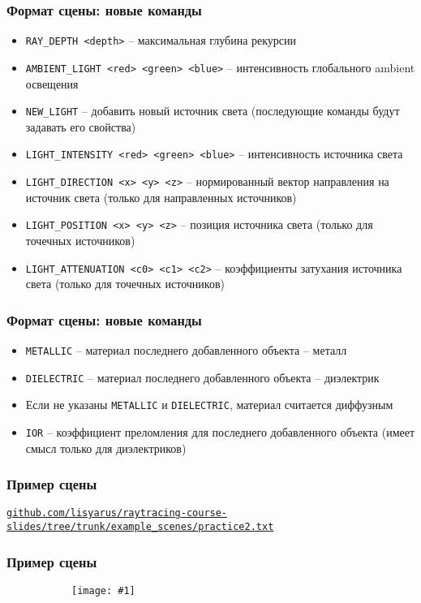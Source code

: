 \documentclass[10pt,handout]{beamer}
\newcommand{\slideimage}[1]{
  \begin{figure}
    \begin{adjustbox}{width=\textwidth, totalheight=\textheight-2\baselineskip-2\baselineskip,keepaspectratio}
      \texttt{[image: \#1]}
    \end{adjustbox}
  \end{figure}
}
\begin{document}
\begin{frame}
\frametitle{Формат сцены: новые команды}
\begin{itemize}
\item \texttt{RAY\_DEPTH <depth>} -- максимальная глубина рекурсии
\item \texttt{AMBIENT\_LIGHT <red> <green> <blue>} -- интенсивность глобального ambient освещения
\item \texttt{NEW\_LIGHT} -- добавить новый источник света (последующие команды будут задавать его свойства)
\item \texttt{LIGHT\_INTENSITY <red> <green> <blue>} -- интенсивность источника света
\item \texttt{LIGHT\_DIRECTION <x> <y> <z>} -- нормированный вектор направления на источник света (только для направленных источников)
\item \texttt{LIGHT\_POSITION <x> <y> <z>} -- позиция источника света (только для точечных источников)
\item \texttt{LIGHT\_ATTENUATION <c0> <c1> <c2>} -- коэффициенты затухания источника света (только для точечных источников)
\end{itemize}
\end{frame}

\begin{frame}
\frametitle{Формат сцены: новые команды}
\begin{itemize}
\item \texttt{METALLIC} -- материал последнего добавленного объекта -- металл
\item \texttt{DIELECTRIC} -- материал последнего добавленного объекта -- диэлектрик
\item Если не указаны \texttt{METALLIC} и \texttt{DIELECTRIC}, материал считается диффузным
\item \texttt{IOR} -- коэффициент преломления для последнего добавленного объекта (имеет смысл только для диэлектриков)
\end{itemize}
\end{frame}


\begin{frame}[fragile]
\frametitle{Пример сцены}
\href{https://github.com/lisyarus/raytracing-course-slides/tree/trunk/example_scenes/practice2.txt}{\texttt{github.com/lisyarus/raytracing-course-slides/tree/trunk/example\_scenes/practice2.txt}}
\end{frame}

\begin{frame}
\frametitle{Пример сцены}
\begin{figure}
\slideimage{result.png}
\end{figure}
\end{frame}
\end{document}
